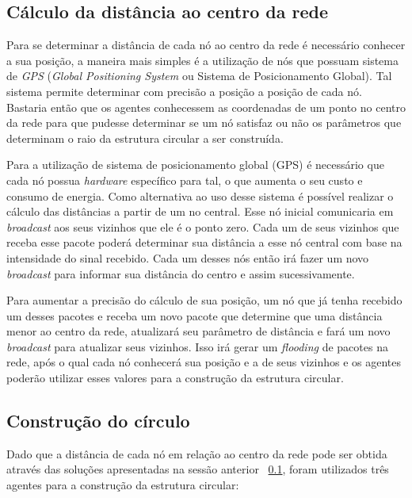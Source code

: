 \subsection{Cálculo da distância ao centro da rede}
\label{sec:calculoDistancia}

Para se determinar a distância de cada nó ao centro da rede é necessário conhecer a sua posição, a maneira mais simples é a utilização de nós que possuam sistema de \emph{GPS} (\emph{Global Positioning System} ou Sistema de Posicionamento Global). Tal sistema permite determinar com precisão a posição a posição de cada nó. Bastaria então que os agentes conhecessem as coordenadas de um ponto no centro da rede para que pudesse determinar se um nó satisfaz ou não os parâmetros que determinam o raio da estrutura circular a ser construída.

Para a utilização de sistema de posicionamento global (GPS) é necessário que cada nó possua \emph{hardware} específico para tal, o que aumenta o seu custo e consumo de energia. Como alternativa ao uso desse sistema é possível realizar o cálculo das distâncias a partir de um no central. Esse nó inicial comunicaria em \emph{broadcast} aos seus vizinhos que ele é o ponto zero. Cada um de seus vizinhos que receba esse pacote poderá determinar sua distância a esse nó central com base na intensidade do sinal recebido.  Cada um desses nós então irá fazer um novo \emph{broadcast} para informar sua distância do centro e assim sucessivamente. 

Para aumentar a precisão do cálculo de sua posição, um nó que já tenha recebido um desses pacotes e receba um novo pacote que determine que uma distância menor ao centro da rede, atualizará seu parâmetro de distância e fará um novo \emph{broadcast} para atualizar seus vizinhos. Isso irá gerar um \emph{flooding} de pacotes na rede, após o qual cada nó conhecerá sua posição e a de seus vizinhos e os agentes poderão utilizar esses valores para a construção da estrutura circular. 

\subsection{Construção do círculo}

Dado que a distância de cada nó em relação ao centro da rede pode ser obtida através das soluções apresentadas na sessão anterior ~\ref{sec:calculoDistancia}, foram utilizados três agentes para a construção da estrutura circular: 

